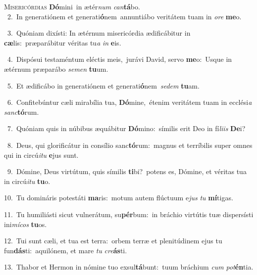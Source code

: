 \lettrine{\initial\textcolor{\initialcolor}{M}}{isericórdias} \textbf{Dó}\-mini~\star in ætér\textit{num} \textit{can}\-\textbf{tá}bo.\\
{\numbfont\textcolor{\numbcolor}{~2.}}~In generatiónem et generati\-\textbf{ó}\-nem~\star annuntiábo veritátem tuam in \textit{o}\-\textit{re} \textbf{me}\-o.\par
{\numbfont\textcolor{\numbcolor}{~3.}}~Quóniam dixísti: In ætérnum misericórdia ædificábitur in \textbf{cæ}\-lis:~\star præparábitur véritas tu\textit{a} \textit{in} \textbf{e}\-is.\par
{\numbfont\textcolor{\numbcolor}{~4.}}~Dispósui testaméntum eléctis meis,~\dagger jurávi David, servo \textbf{me}\-o:~\star Usque in ætérnum præparábo \textit{se}\-\textit{men} \textbf{tu}\-um.\par
{\numbfont\textcolor{\numbcolor}{~5.}}~Et ædificábo in generatiónem et generati\-\textbf{ó}\-nem~\star \textit{se}\-\textit{dem} \textbf{tu}\-am.\par
{\numbfont\textcolor{\numbcolor}{~6.}}~Confitebúntur cæli mirabília tua, \textbf{Dó}\-mine,~\star étenim veritátem tuam in ecclési\textit{a} \textit{sanc}\-\textbf{tó}rum.\par
{\numbfont\textcolor{\numbcolor}{~7.}}~Quóniam quis in núbibus æquábitur \textbf{Dó}\-mino:~\star símilis erit Deo in fí\-\textit{li}\-\textit{is} \textbf{De}\-i?\par
{\numbfont\textcolor{\numbcolor}{~8.}}~Deus, qui glorificátur in consílio sanc\-\textbf{tó}\-rum:~\star magnus et terríbilis super omnes qui in circú\-\textit{i}\-\textit{tu} \textbf{e}\-jus sunt.\par
{\numbfont\textcolor{\numbcolor}{~9.}}~Dómine, Deus virtútum, quis símilis \textbf{ti}\-bi?~\star potens es, Dómine, et véritas tua in circú\-\textit{i}\-\textit{tu} \textbf{tu}\-o.\par
{\numbfont\textcolor{\numbcolor}{10.}}~Tu domináris potestáti \textbf{ma}\-ris:~\star motum autem flúctuum e\textit{jus} \textit{tu} \textbf{mí}\-tigas.\par
{\numbfont\textcolor{\numbcolor}{11.}}~Tu humiliásti sicut vulnerátum, su\-\textbf{pér}\-bum:~\star in bráchio virtútis tuæ dispersísti ini\-\textit{mí}\-\textit{cos} \textbf{tu}\-os.\par
{\numbfont\textcolor{\numbcolor}{12.}}~Tui sunt cæli, et tua est terra:~\dagger orbem terræ et plenitúdinem ejus tu fun\-\textbf{dás}\-ti:~\star aquilónem, et mare \textit{tu} \textit{cre}\-\textbf{ás}ti.\par
{\numbfont\textcolor{\numbcolor}{13.}}~Thabor et Hermon in nómine tuo exsul\-\textbf{tá}\-bunt:~\star tuum bráchium \textit{cum} \textit{pot}\-\textbf{én}tia.\par
